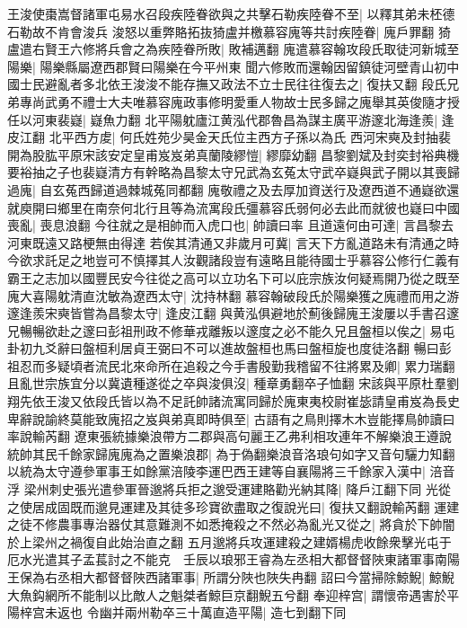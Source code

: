 王浚使棗嵩督諸軍屯易水召段疾陸眷欲與之共擊石勒疾陸眷不至|{
	以釋其弟未柸德石勒故不肯會浚兵}
浚怒以重弊賂拓抜猗盧并檄慕容廆等共討疾陸眷|{
	廆戶罪翻}
猗盧遣右賢王六修將兵會之為疾陸眷所敗|{
	敗補邁翻}
廆遣慕容翰攻段氏取徒河新城至陽樂|{
	陽樂縣屬遼西郡賢曰陽樂在今平州東}
聞六修敗而還翰因留鎮徒河壁青山初中國士民避亂者多北依王浚浚不能存撫又政法不立士民往往復去之|{
	復扶又翻}
段氏兄弟專尚武勇不禮士大夫唯慕容廆政事修明愛重人物故士民多歸之廆舉其英俊隨才授任以河東裴嶷|{
	嶷魚力翻}
北平陽躭廬江黄泓代郡魯昌為謀主廣平游邃北海逢羨|{
	逢皮江翻}
北平西方䖍|{
	何氏姓苑少昊金天氏位主西方子孫以為氏}
西河宋奭及封抽裴開為股肱平原宋該安定皇甫岌岌弟真蘭陵繆愷|{
	繆靡幼翻}
昌黎劉斌及封奕封裕典機要裕抽之子也裴嶷清方有幹略為昌黎太守兄武為玄菟太守武卒嶷與武子開以其喪歸過廆|{
	自玄菟西歸道過棘城菟同都翻}
廆敬禮之及去厚加資送行及遼西道不通嶷欲還就庾開曰鄉里在南奈何北行且等為流寓段氏彊慕容氏弱何必去此而就彼也嶷曰中國喪亂|{
	喪息浪翻}
今往就之是相帥而入虎口也|{
	帥讀曰率}
且道遠何由可達|{
	言昌黎去河東既遠又路梗無由得達}
若俟其清通又非歲月可冀|{
	言天下方亂道路未有清通之時}
今欲求託足之地豈可不慎擇其人汝觀諸段豈有遠略且能待國士乎慕容公修行仁義有霸王之志加以國豐民安今往從之高可以立功名下可以庇宗族汝何疑焉開乃從之既至廆大喜陽躭清直沈敏為遼西太守|{
	沈持林翻}
慕容翰破段氏於陽樂獲之廆禮而用之游邃逢羨宋奭皆嘗為昌黎太守|{
	逢皮江翻}
與黄泓俱避地於薊後歸廆王浚屢以手書召邃兄暢暢欲赴之邃曰彭祖刑政不修華戎離叛以邃度之必不能久兄且盤桓以俟之|{
	易屯卦初九爻辭曰盤桓利居貞王弼曰不可以進故盤桓也馬曰盤桓旋也度徒洛翻}
暢曰彭祖忍而多疑頃者流民北來命所在追殺之今手書殷勤我稽留不往將累及卿|{
	累力瑞翻}
且亂世宗族宜分以冀遺種遂從之卒與浚俱沒|{
	種章勇翻卒子恤翻}
宋該與平原杜羣劉翔先依王浚又依段氏皆以為不足託帥諸流寓同歸於廆東夷校尉崔毖請皇甫岌為長史卑辭說諭終莫能致廆招之岌與弟真即時俱至|{
	古語有之鳥則擇木木豈能擇鳥帥讀曰率說輸芮翻}
遼東張統據樂浪帶方二郡與高句麗王乙弗利相攻連年不解樂浪王遵說統帥其民千餘家歸廆廆為之置樂浪郡|{
	為于偽翻樂浪音洛琅句如字又音句驪力知翻}
以統為太守遵參軍事王如餘黨涪陵李運巴西王建等自襄陽將三千餘家入漢中|{
	涪音浮}
梁州刺史張光遣參軍晉邈將兵拒之邈受運建賂勸光納其降|{
	降戶江翻下同}
光從之使居成固既而邈見運建及其徒多珍寶欲盡取之復說光曰|{
	復扶又翻說輸芮翻}
運建之徒不修農事專治器仗其意難測不如悉掩殺之不然必為亂光又從之|{
	將貪於下帥闇於上梁州之禍復自此始治直之翻}
五月邈將兵攻運建殺之建婿楊虎收餘衆擊光屯于厄水光遣其子孟萇討之不能克　壬辰以琅邪王睿為左丞相大都督督陜東諸軍事南陽王保為右丞相大都督督陜西諸軍事|{
	所謂分陜也陜失冉翻}
詔曰今當掃除鯨鯢|{
	鯨鯢大魚鈎網所不能制以比敵人之魁桀者鯨巨京翻鯢五兮翻}
奉迎梓宫|{
	謂懷帝遇害於平陽梓宫未返也}
令幽并兩州勒卒三十萬直造平陽|{
	造七到翻下同}

